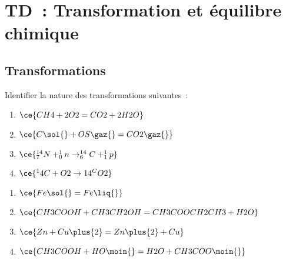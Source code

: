 \documentclass[a4paper, 12pt, final, garamond]{book}
\begin{document}
\setcounter{chapter}{1}

\chapter{TD~: Transformation et \'equilibre chimique}

\section{Transformations}
Identifier la nature des transformations suivantes~:\\

\begin{minipage}{0.40\linewidth}
	\begin{enumerate}
		\item $\ce{CH4 + 2O2 = CO2 + 2H2O}$
		\item $\ce{C\sol{} + OS\gaz{} = CO2\gaz{}}$
		\item $\ce{^{14}_{7}N + ^{1}_{0}n \rightarrow ^{14}_{6}C + ^1_1p}$
		\item $\ce{^14C + O2 \rightarrow 14^CO2}$
	\end{enumerate}
\end{minipage}
\hfill
\begin{minipage}{0.60\linewidth}
	\begin{enumerate}[start=5]
		\item $\ce{Fe\sol{} = Fe\liq{}}$
		\item $\ce{CH3COOH + CH3CH2OH = CH3COOCH2CH3 + H2O}$
		\item $\ce{Zn + Cu\plus{2} = Zn\plus{2} + Cu}$
		\item $\ce{CH3COOH + HO\moin{} = H2O + CH3COO\moin{}}$
	\end{enumerate}
\end{minipage}
\end{document}
